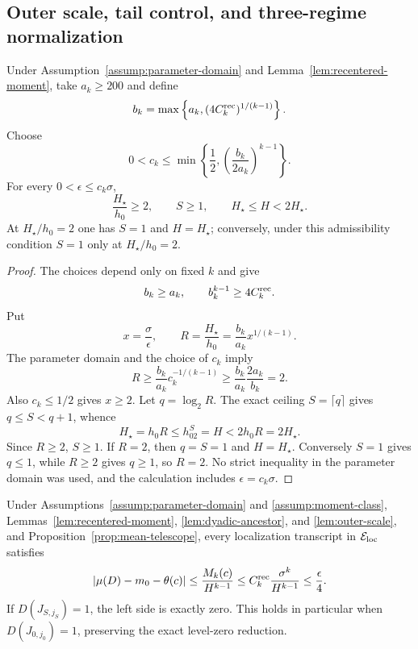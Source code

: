 \subsection{Outer scale, tail control, and three-regime normalization}

\begin{lemma}
\label{lem:outer-scale}
Under Assumption~\ref{assump:parameter-domain} and
Lemma~\ref{lem:recentered-moment}, take $a_k\geq200$ and define
\[
 b_k=\max\left\{a_k,(4C_k^{\rm rec})^{1/(k-1)}\right\}.
\]
Choose
\[
 0<c_k\leq\min\left\{\frac12,
   \left(\frac{b_k}{2a_k}\right)^{k-1}\right\}.
\]
For every $0<\epsilon\leq c_k\sigma$,
\[
 \frac{H_\star}{h_0}\geq2,\qquad S\geq1,\qquad
 H_\star\leq H<2H_\star.
\]
At $H_\star/h_0=2$ one has $S=1$ and $H=H_\star$; conversely, under
this admissibility condition $S=1$ only at $H_\star/h_0=2$.
\end{lemma}

\begin{proof}
The choices depend only on fixed $k$ and give
\[
 b_k\geq a_k,\qquad b_k^{k-1}\geq4C_k^{\rm rec}.
\]
Put
\[
 x=\frac\sigma\epsilon,\qquad
 R=\frac{H_\star}{h_0}=\frac{b_k}{a_k}x^{1/(k-1)}.
\]
The parameter domain and the choice of $c_k$ imply
\[
 R\geq\frac{b_k}{a_k}c_k^{-1/(k-1)}
 \geq\frac{b_k}{a_k}\frac{2a_k}{b_k}=2.
\]
Also $c_k\leq1/2$ gives $x\geq2$.  Let $q=\log_2R$.  The exact ceiling
$S=\lceil q\rceil$ gives $q\leq S<q+1$, whence
\[
 H_\star=h_0R\leq h_02^S=H<2h_0R=2H_\star.
\]
Since $R\geq2$, $S\geq1$.  If $R=2$, then $q=S=1$ and
$H=H_\star$.  Conversely $S=1$ gives $q\leq1$, while $R\geq2$ gives
$q\geq1$, so $R=2$.  No strict inequality in the parameter domain was used,
and the calculation includes $\epsilon=c_k\sigma$.
\end{proof}

\begin{proposition}\label{prop:tail-bound}
Under Assumptions~\ref{assump:parameter-domain} and
\ref{assump:moment-class}, Lemmas~\ref{lem:recentered-moment},
\ref{lem:dyadic-ancestor}, and \ref{lem:outer-scale}, and
Proposition~\ref{prop:mean-telescope}, every localization transcript in
$\mathcal E_{\rm loc}$ satisfies
\[
 |\mu(D)-m_0-\theta(c)|
 \leq\frac{M_k(c)}{H^{k-1}}
 \leq C_k^{\rm rec}\frac{\sigma^k}{H^{k-1}}
 \leq\frac\epsilon4.
\]
If $D(J_{S,j_S})=1$, the left side is exactly zero.  This holds in
particular when $D(J_{0,j_0})=1$, preserving the exact level-zero reduction.
\end{proposition}

